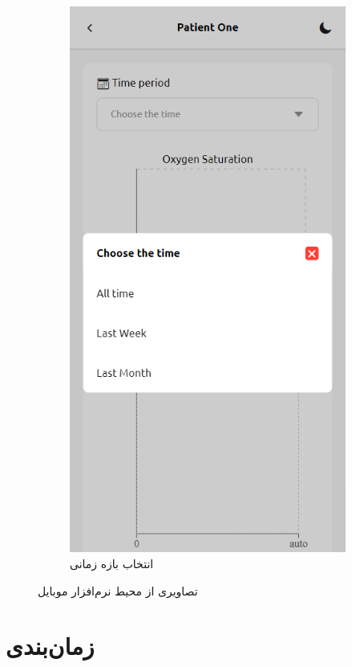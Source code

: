\documentclass[12pt]{article}
\begin{document}
\begin{figure}
\begin{center}
\begin{subfigure}{.3\textwidth}
			\includegraphics[width=.9\linewidth]{app2_period}
			\caption{انتخاب بازه زمانی}
			\label{time_picker}
		\end{subfigure}
		\caption{تصاویری از محیط نرم‌افزار موبایل}
		\label{app_screenshots}
	\end{center}
\end{figure}

\newpage
\section{زمان‌بندی} \label{gantt}
\end{document}
